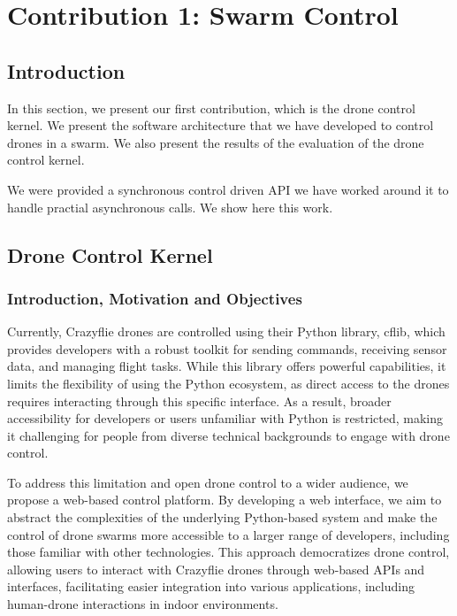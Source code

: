\section{Contribution 1: Swarm Control}

\subsection{Introduction}
In this section, we present our first contribution, which is the drone control kernel. We present the software architecture that we have developed to control drones in a swarm. We also present the results of the evaluation of the drone control kernel.


We were provided a synchronous control driven \gls{API} we have worked around it to handle practial asynchronous calls. We show here this work.


\subsection{Drone Control Kernel}

\subsubsection{Introduction, Motivation and Objectives}
Currently, Crazyflie drones are controlled using their Python library, cflib, which provides developers with a robust toolkit for sending commands, receiving sensor data, and managing flight tasks. While this library offers powerful capabilities, it limits the flexibility of using the Python ecosystem, as direct access to the drones requires interacting through this specific interface. As a result, broader accessibility for developers or users unfamiliar with Python is restricted, making it challenging for people from diverse technical backgrounds to engage with drone control.

To address this limitation and open drone control to a wider audience, we propose a web-based control platform. By developing a web interface, we aim to abstract the complexities of the underlying Python-based system and make the control of drone swarms more accessible to a larger range of developers, including those familiar with other technologies. This approach democratizes drone control, allowing users to interact with Crazyflie drones through web-based \gls{API}s and interfaces, facilitating easier integration into various applications, including human-drone interactions in indoor environments.

